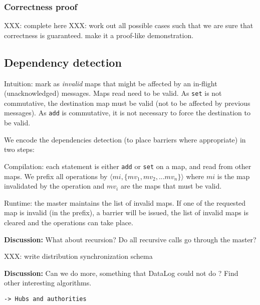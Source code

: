 \documentclass[11pt]{article}
\newlength{\dlen}
\def\discuss#1{\par\hspace{2em}
\setlength{\dlen}{\textwidth}
\addtolength{\dlen}{-2em}
\begin{minipage}{\dlen}\footnotesize {\bf\color{red} Discussion:} #1\end{minipage}\par}
\begin{document}
\subsubsection*{Correctness proof}
{\color{red} XXX: complete here}
XXX: work out all possible cases such that we are sure that correctness is guaranteed.
make it a proof-like demonstration.

\subsection{Dependency detection}
Intuition: mark as \textit{invalid} maps that might be affected by an in-flight (unacknowledged) messages. Maps read need to be valid. As {\tt set} is not commutative, the destination map must be valid (not to be affected by previous messages). As {\tt add} is commutative, it is not necessary to force the destination to be valid.

We encode the dependencies detection (to place barriers where appropriate) in two steps:\ol
\item Compilation: each statement is either {\tt add} or {\tt set} on a map, and read from other maps. We prefix all operations by $\langle mi,\{ mv_1,mv_2,...mv_n \}\rangle$ where $mi$ is the map invalidated by the operation and $mv_i$ are the maps that must be valid.
\item Runtime: the master maintains the list of invalid maps. If one of the requested map is invalid (in the prefix), a barrier will be issued, the list of invalid maps is cleared and the operations can take place.
\ole
\discuss{What about recursion? Do all recursive calls go through the master?}



XXX: write distribution synchronization schema

\discuss{Can we do more, something that DataLog could not do ? Find other interesting algorithms.}

\begin{verbatim}
-> Hubs and authorities
\end{verbatim}
\end{document}
